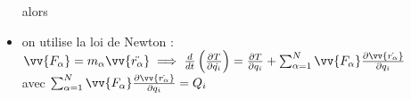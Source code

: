 \documentclass[12pt,oneside]{book}
\begin{document}
\begin{small}
\begin{itemize}
\begin{itemize}
	      \end{itemize}
	      alors \begin{center}
	      \end{center}
	\item on utilise la loi de Newton : $ \vv{F_\alpha} = m_\alpha\vv{\ddot{r_\alpha}} \implies  \frac{d}{dt}\left( \frac{\partial T}{\partial \dot{q_i}} \right) =\frac{\partial T}{\partial q_i} + \sum^N_{\alpha = 1}\vv{F_\alpha}\frac{\partial\vv{\dot{r_\alpha}}}{\partial q_i}$  \\
	      avec $\sum^N_{\alpha = 1}\vv{F_\alpha}\frac{\partial\vv{\dot{r_\alpha}}}{\partial q_i} = Q_i$
	      \begin{center}
		\end{center}
\end{itemize}
\end{small}

\pagebreak
\end{document}
